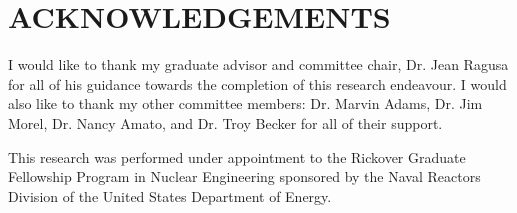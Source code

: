 %
%
%


\chapter*{ACKNOWLEDGEMENTS}


I would like to thank my graduate advisor and committee chair, Dr. Jean Ragusa for all of his guidance towards the completion of this research endeavour. I would also like to thank my other committee members: Dr. Marvin Adams, Dr. Jim Morel, Dr. Nancy Amato, and Dr. Troy Becker for all of their support.

This research was performed under appointment to the Rickover Graduate Fellowship Program in Nuclear Engineering sponsored by the Naval Reactors Division of the United States Department of Energy.


\pagebreak{}